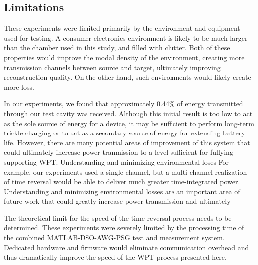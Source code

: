 \subsection{Limitations}
\label{sec:limitations}


These experiments were limited primarily by the environment and equipment used
for testing.
%
A consumer electronics environment is likely to be much larger than the chamber
used in this study, and filled with clutter.
%
Both of these properties would improve the modal density of the environment,
creating more transmission channels between source and target, ultimately
improving reconstruction quality.
%
On the other hand, such environments would likely create more loss.



In our experiments, we found that approximately 0.44\% of energy transmitted
through our test cavity was received.
%
Although this initial result is too low to act as the sole source of energy for
a device, it may be sufficient to perform long-term trickle charging or to act
as a secondary source of energy for extending battery life.
%
However, there are many potential areas of improvement of this system that could
ultimately increase power tranmission to a level sufficient for fullying supporting
WPT.
%
Understanding and minimizing environmental loses
%
For example, our experiments used a single channel, but a multi-channel realization
of time reversal would be able to deliver much greater time-integrated power.
%
Understanding and minimizing environmental losses are an important area of future
work that could greatly increase power transmission and ultimately
%




The theoretical limit for the speed of the time reversal process needs to be
determined.
%
These experiments were severely limited by the processing time of the combined
MATLAB-DSO-AWG-PSG test and measurement system.
%
Dedicated hardware and firmware would eliminate communication overhead and thus
dramatically improve the speed of the WPT process presented here.
